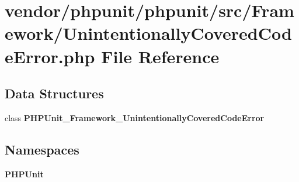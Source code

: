 \section{vendor/phpunit/phpunit/src/\+Framework/\+Unintentionally\+Covered\+Code\+Error.php File Reference}
\label{_unintentionally_covered_code_error_8php}
\subsection*{Data Structures}
\begin{DoxyCompactItemize}
\item 
class {\bf P\+H\+P\+Unit\+\_\+\+Framework\+\_\+\+Unintentionally\+Covered\+Code\+Error}
\end{DoxyCompactItemize}
\subsection*{Namespaces}
\begin{DoxyCompactItemize}
\item 
 {\bf P\+H\+P\+Unit}
\end{DoxyCompactItemize}

